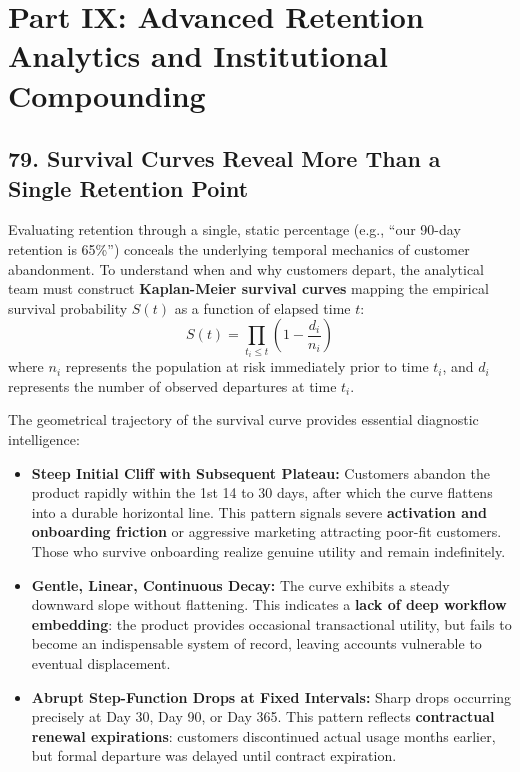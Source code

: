 \section*{Part IX: Advanced Retention Analytics and Institutional Compounding}

\subsection*{79. Survival Curves Reveal More Than a Single Retention Point}

Evaluating retention through a single, static percentage (e.g., ``our 90-day retention is 65\%'') conceals the underlying temporal mechanics of customer abandonment. To understand when and why customers depart, the analytical team must construct \textbf{Kaplan-Meier survival curves} mapping the empirical survival probability $S(t)$ as a function of elapsed time $t$:
\begin{equation}
S(t) = \prod_{t_i \le t} \left(1 - \frac{d_i}{n_i}\right)
\end{equation}
where $n_i$ represents the population at risk immediately prior to time $t_i$, and $d_i$ represents the number of observed departures at time $t_i$.

The geometrical trajectory of the survival curve provides essential diagnostic intelligence:
\begin{itemize}[leftmargin=*]
\item \textbf{Steep Initial Cliff with Subsequent Plateau:} Customers abandon the product rapidly within the 1st 14 to 30 days, after which the curve flattens into a durable horizontal line. This pattern signals severe \textbf{activation and onboarding friction} or aggressive marketing attracting poor-fit customers. Those who survive onboarding realize genuine utility and remain indefinitely.
\item \textbf{Gentle, Linear, Continuous Decay:} The curve exhibits a steady downward slope without flattening. This indicates a \textbf{lack of deep workflow embedding}: the product provides occasional transactional utility, but fails to become an indispensable system of record, leaving accounts vulnerable to eventual displacement.
\item \textbf{Abrupt Step-Function Drops at Fixed Intervals:} Sharp drops occurring precisely at Day 30, Day 90, or Day 365. This pattern reflects \textbf{contractual renewal expirations}: customers discontinued actual usage months earlier, but formal departure was delayed until contract expiration.
\end{itemize}

